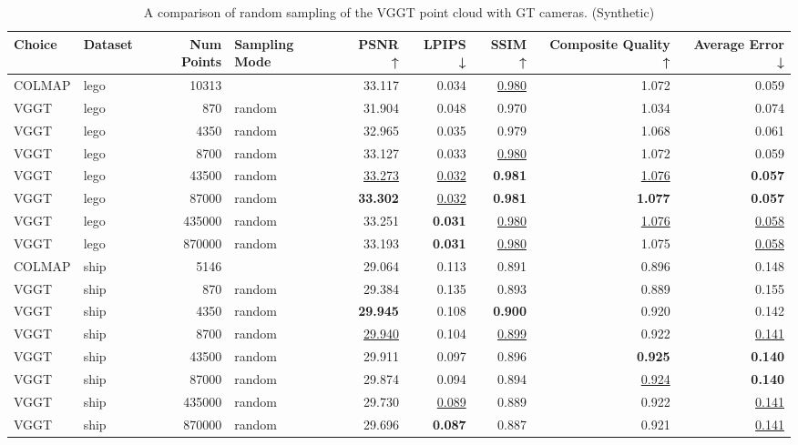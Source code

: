 \begin{table}[H]
\caption{A comparison of random sampling of the VGGT point cloud with GT cameras. (Synthetic)}
\label{tab:03_random_gt_cams_synthetic}
\centering
\scriptsize
\begin{tabular}{llrlrrrrr}
\toprule
Choice & Dataset & Num Points & Sampling Mode & PSNR ↑ & LPIPS ↓ & SSIM ↑ & Composite Quality ↑ & Average Error ↓ \\
\midrule
COLMAP & lego & 10313 &  & 33.117 & 0.034 & \underline{0.980} & 1.072 & 0.059 \\
VGGT & lego & 870 & random & 31.904 & 0.048 & 0.970 & 1.034 & 0.074 \\
VGGT & lego & 4350 & random & 32.965 & 0.035 & 0.979 & 1.068 & 0.061 \\
VGGT & lego & 8700 & random & 33.127 & 0.033 & \underline{0.980} & 1.072 & 0.059 \\
VGGT & lego & 43500 & random & \underline{33.273} & \underline{0.032} & \textbf{0.981} & \underline{1.076} & \textbf{0.057} \\
VGGT & lego & 87000 & random & \textbf{33.302} & \underline{0.032} & \textbf{0.981} & \textbf{1.077} & \textbf{0.057} \\
VGGT & lego & 435000 & random & 33.251 & \textbf{0.031} & \underline{0.980} & \underline{1.076} & \underline{0.058} \\
VGGT & lego & 870000 & random & 33.193 & \textbf{0.031} & \underline{0.980} & 1.075 & \underline{0.058} \\
\midrule
COLMAP & ship & 5146 &  & 29.064 & 0.113 & 0.891 & 0.896 & 0.148 \\
VGGT & ship & 870 & random & 29.384 & 0.135 & 0.893 & 0.889 & 0.155 \\
VGGT & ship & 4350 & random & \textbf{29.945} & 0.108 & \textbf{0.900} & 0.920 & 0.142 \\
VGGT & ship & 8700 & random & \underline{29.940} & 0.104 & \underline{0.899} & 0.922 & \underline{0.141} \\
VGGT & ship & 43500 & random & 29.911 & 0.097 & 0.896 & \textbf{0.925} & \textbf{0.140} \\
VGGT & ship & 87000 & random & 29.874 & 0.094 & 0.894 & \underline{0.924} & \textbf{0.140} \\
VGGT & ship & 435000 & random & 29.730 & \underline{0.089} & 0.889 & 0.922 & \underline{0.141} \\
VGGT & ship & 870000 & random & 29.696 & \textbf{0.087} & 0.887 & 0.921 & \underline{0.141} \\

\end{tabular}
\end{table}
